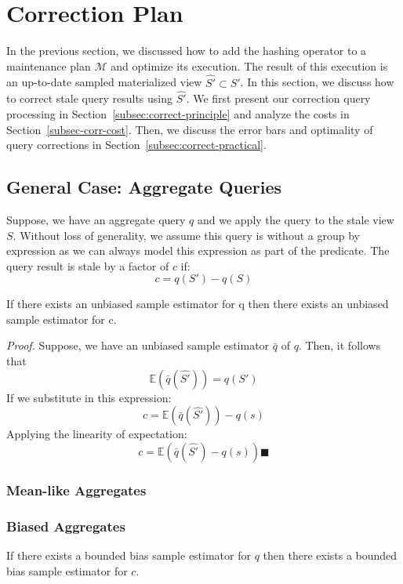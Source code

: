 
\section{Correction Plan}
\label{correction}
In the previous section, we discussed how to add the hashing operator to a maintenance plan $\mathcal{M}$ and optimize its execution.
The result of this execution is an up-to-date sampled materialized view $\hat{S'} \subset S'$.
In this section, we discuss how to correct stale query results using $\hat{S'}$. 
We first present our correction query processing in Section~\ref{subsec:correct-principle} and analyze the costs in Section~\ref{subsec-corr-cost}. Then, we discuss the error bars and optimality of query corrections in Section~\ref{subsec:correct-practical}.

\subsection{General Case: Aggregate Queries}
Suppose, we have an aggregate query $q$ and we apply the query to the stale view $S$.
Without loss of generality, we assume this query is without a group by expression as we can always model this expression as part of the predicate.
The query result is stale by a factor of $c$ if:
\[ c = q(S') - q(S)\] 
\begin{lemma}
If there exists an unbiased sample estimator for q then there exists an unbiased sample estimator for c.
\end{lemma}

\emph{Proof.} Suppose, we have an unbiased sample estimator $\bar{q}$ of $q$. 
Then, it follows that \[\mathbb{E}(\bar{q}(\hat{S'})) = q(S')\]
If we substitute in this expression:
\[ c = \mathbb{E}(\bar{q}(\hat{S'})) -q(s) \] 
Applying the linearity of expectation:
\[ c = \mathbb{E}(\bar{q}(\hat{S'}) - q(s)) \blacksquare \]

\subsubsection{Mean-like Aggregates}

\subsubsection{Biased Aggregates}

\begin{corollary}
If there exists a bounded bias sample estimator for $q$ then there exists a bounded bias sample estimator for $c$.
\end{corollary}



